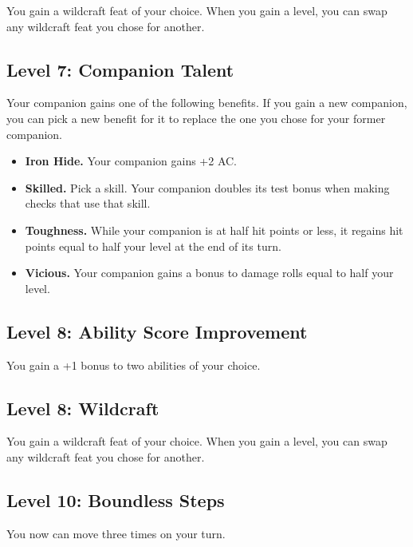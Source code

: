\documentclass[12pt,letterpaper,twocolumn,openany,nodeprecatedcode,bg=none]{dndbook}
\providecommand{\tightlist}{%
  \setlength{\itemsep}{0pt}\setlength{\parskip}{0pt}}
\begin{document}
You gain a wildcraft feat of your choice. When you gain a level, you can
swap any wildcraft feat you chose for another.

\subsection{Level 7: Companion Talent}\label{level-7-companion-talent}

Your companion gains one of the following benefits. If you gain a new
companion, you can pick a new benefit for it to replace the one you
chose for your former companion.

\begin{itemize}
\tightlist
\item
  \textbf{Iron Hide.} Your companion gains +2 AC.
\item
  \textbf{Skilled.} Pick a skill. Your companion doubles its test bonus
  when making checks that use that skill.
\item
  \textbf{Toughness.} While your companion is at half hit points or
  less, it regains hit points equal to half your level at the end of its
  turn.
\item
  \textbf{Vicious.} Your companion gains a bonus to damage rolls equal
  to half your level.
\end{itemize}

\subsection{Level 8: Ability Score
Improvement}\label{level-8-ability-score-improvement}

You gain a +1 bonus to two abilities of your choice.

\subsection{Level 8: Wildcraft}\label{level-8-wildcraft}

You gain a wildcraft feat of your choice. When you gain a level, you can
swap any wildcraft feat you chose for another.

\subsection{Level 10: Boundless Steps}\label{level-10-boundless-steps}

You now can move three times on your turn.

\onecolumn
\end{document}
